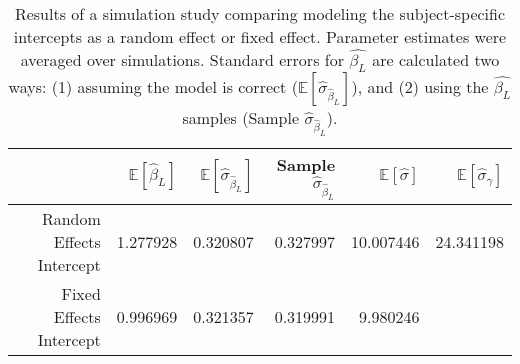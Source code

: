 \begin{table}[ht]
\centering
\begingroup\small
\begin{tabular}{rrrrrr}
  \toprule
 & $\mathbb{E}\left[\hat{\beta}_L\right]$ & $\mathbb{E}\left[\hat{\sigma}_{\hat{\beta}_L}\right]$ & Sample $\hat{\sigma}_{\hat{\beta}_L}$ & $\mathbb{E}\left[\hat{\sigma}\right]$ & $\mathbb{E}\left[\hat{\sigma}_{\gamma}\right]$ \\ 
  \midrule
Random Effects Intercept & 1.277928 & 0.320807 & 0.327997 & 10.007446 & 24.341198 \\ 
  Fixed Effects Intercept & 0.996969 & 0.321357 & 0.319991 & 9.980246 &  \\ 
   \bottomrule
\end{tabular}
\endgroup
\caption{\small Results of a simulation study comparing modeling the  subject-specific intercepts as a random effect or fixed effect. Parameter estimates were averaged over simulations. Standard errors for $\hat{\beta_L}$ are calculated two ways: (1) assuming the model is correct ($\mathbb{E}\left[\hat{\sigma}_{\hat{\beta}_L}\right]$), and (2) using the $\hat{\beta_L}$ samples (Sample $\hat{\sigma}_{\hat{\beta}_L}$).} 
\label{tab:simulation_comparison}
\end{table}
